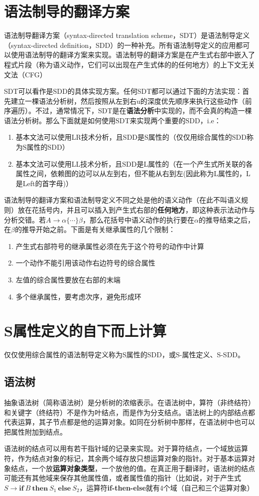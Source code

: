 \documentclass[]{report}
\begin{document}
	\section{语法制导的翻译方案}\label{section:SDT}
	语法制导翻译方案（syntax-directed translation scheme，SDT）是语法制导定义（syntax-directed definition，SDD）的一种补充。所有语法制导定义的应用都可以使用语法制导的翻译方案来实现。语法制导的翻译方案是在产生式右部中嵌入了程式片段（称为语义动作，它们可以出现在产生式体的的任何地方）的上下文无关文法（CFG）\par
	SDT可以看作是SDD的具体实现方案。任何SDT都可以通过下面的方法实现：首先建立一棵语法分析树，然后按照从左到右u的深度优先顺序来执行这些动作（前序遍历）。不过，通常情况下，SDT是在\textbf{语法分析}中实现的，而不会真的构造一棵语法分析树。那么下面就是如何使用SDT来实现两个重要的SDD，i.e：
	\begin{enumerate}
		\item 基本文法可以使用LR技术分析，且SDD是S属性的（仅仅用综合属性的SDD称为S属性的SDD）
		\item 基本文法可以使用LL技术分析，且SDD是L属性的（在一个产生式所关联的各属性之间，依赖图的边可以从左到右，但不能从右到左(因此称为L属性的，L是Left的首字母)）
	\end{enumerate}
	语法制导的翻译方案和语法制导定义不同之处是他的语义动作（在此不叫语义规则）放在花括号内，并且可以插入到产生式右部的\textbf{任何地方}，即这种表示法动作与分析交错。若$A\to\alpha\{\cdots\}\beta$，那么花括号中语义动作的执行要在$\alpha$的推导结束之后，在$\beta$的推导开始之前。下面是有关继承属性的几个限制：
	\begin{enumerate}
		\item 产生式右部符号的继承属性必须在先于这个符号的动作中计算
		\item 一个动作不能引用该动作右边符号的综合属性
		\item 左值的综合属性要放在右部的末端
		\item 多个继承属性，要考虑次序，避免形成环
	\end{enumerate}
	\section{S属性定义的自下而上计算}
	仅仅使用综合属性的语法制导定义称为S属性的SDD，或S-属性定义、S-SDD。
		\subsection{语法树}
		抽象语法树（简称语法树）是分析树的浓缩表示。在语法树中，算符（非终结符）和关键字（终结符）不是作为叶结点，而是作为分支结点。语法树上的内部结点都代表运算，其子节点都是他的运算对象。如同在分析树中那样，在语法树中也可以把属性附加到结点。\par
		语法树的结点可以用有若干指针域的记录来实现。对于算符结点，一个域放运算符，作为结点对象的标记，其余两个域存放只想运算对象的指针。对于基本运算对象结点，一个放\textbf{运算对象类型}，一个放他的值。在真正用于翻译时，语法树的结点可能还有其他域来保存其他属性值，或者属性值的指针（比如说，对于产生式$S\to\mathbf{if}\ B\ \mathbf{then}\ S_1\ \mathbf{else}\ S_2$，运算符\textbf{if-then-else}就有4个域（自己和三个运算对象）
\end{document}
